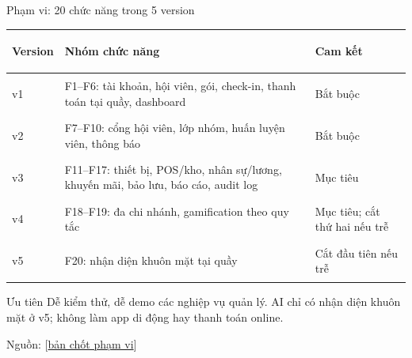 \documentclass[aspectratio=169,10pt]{beamer}
\begin{document}
\begin{frame}{Phạm vi: 20 chức năng trong 5 version}
  \footnotesize
  \begin{tabularx}{\textwidth}{>{\bfseries\raggedright\arraybackslash}p{1.4cm} >{\raggedright\arraybackslash}X >{\raggedright\arraybackslash}p{2.6cm}}
    \toprule
    Version & Nhóm chức năng & Cam kết \\
    \midrule
    v1 & F1--F6: tài khoản, hội viên, gói, check-in, thanh toán tại quầy, dashboard & Bắt buộc \\
    v2 & F7--F10: cổng hội viên, lớp nhóm, huấn luyện viên, thông báo & Bắt buộc \\
    v3 & F11--F17: thiết bị, POS/kho, nhân sự/lương, khuyến mãi, bảo lưu, báo cáo, audit log & Mục tiêu \\
    v4 & F18--F19: đa chi nhánh, gamification theo quy tắc & Mục tiêu; cắt thứ hai nếu trễ \\
    v5 & F20: nhận diện khuôn mặt tại quầy & Cắt đầu tiên nếu trễ \\
    \bottomrule
  \end{tabularx}
  \vfill
  \begin{block}{Ưu tiên}
    Dễ kiểm thử, dễ demo các nghiệp vụ quản lý. AI chỉ có nhận diện khuôn mặt ở v5; không làm app di động hay thanh toán online.
  \end{block}
  \scriptsize Nguồn: [\href{https://github.com/Ktin06/it3180_nhom6_gym_management/blob/main/docs/requirements/ban-chot-pham-vi.md}{bản chốt phạm vi}]
\end{frame}
\end{document}
